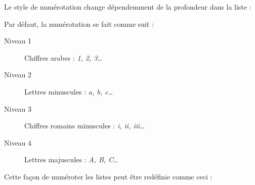 Le style de numérotation change dépendemment de la profondeur dans la liste :



Par défaut, la numérotation se fait comme suit :

\begin{description}
  \item[Niveau 1] Chiffres arabes : \emph{1, 2, 3\dots}
  \item[Niveau 2] Lettres minuscules : \emph{a, b, c\dots}
  \item[Niveau 3] Chiffres romains minuscules : \emph{i, ii, iii\dots}
  \item[Niveau 4] Lettres majuscules : \emph{A, B, C\dots}
\end{description}

Cette façon de numéroter les listes peut être redéfinie comme ceci :

% 
